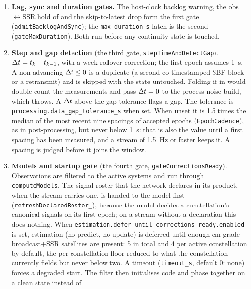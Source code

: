 \documentclass[main.tex]{subfiles}
\begin{document}
\begin{enumerate}[leftmargin=*, itemsep=0pt]
\item \textbf{Lag, sync and duration gates.}  The host-clock backlog
      warning, the obs$\leftrightarrow$SSR hold of 
      and the skip-to-latest drop form the first gate
      (\texttt{admitBacklogAndSync}); the \texttt{max\_duration\_s} latch
      is the second (\texttt{gateMaxDuration}).  Both run before any
      continuity state is touched.
\item \textbf{Step and gap detection} (the third gate,
      \texttt{stepTimeAndDetectGap}).
      $\Delta t = t_k - t_{k-1}$, with a week-rollover correction; the first
      epoch assumes \SI{1}{\second}.  A non-advancing $\Delta t \le 0$ is a
      duplicate (a second co-timestamped SBF block or a retransmit) and
      is skipped with the state untouched.  Folding it in would
      double-count the measurements and pass $\Delta t = 0$ to the
      process-noise build, which throws.  A $\Delta t$ above the gap
      tolerance flags a gap.  The tolerance is
      \texttt{processing.data\_gap\_tolerance\_s} when set.  When unset
      it is 1.5 times the median of the most recent nine spacings of
      accepted epochs (\texttt{EpochCadence}), as in post-processing, but never
      below \SI{1}{\second}: that is also the value until a first spacing has
      been measured, and a stream of \SI{1.5}{\hertz} or faster keeps it.
      A spacing is judged before it joins the window.
\item \textbf{Models and startup gate} (the fourth gate,
      \texttt{gateCorrectionsReady}).  Observations
      are filtered to the active systems and run through
      \texttt{computeModels}.  The signal roster that the network declares in
      its product, when the stream carries one, is handed to the model first
      (\texttt{refreshDeclaredRoster\_}), because the model decides a
      constellation's canonical signals on its first epoch; on a stream without
      a declaration this does nothing.  When
      \texttt{estimation.defer\_until\_corrections\_ready.enabled} is set,
      estimation (no predict, no update) is deferred until enough cm-grade
      broadcast$+$SSR satellites are present: 5 in total and 4 per
      active constellation by default, the per-constellation floor
      reduced to what the constellation currently fields but never
      below two.  A timeout (\texttt{timeout\_s}, default $0$: none) forces a
      degraded start.  The filter then
      initialises code and phase together on a clean state instead of

\end{enumerate}
\end{document}

